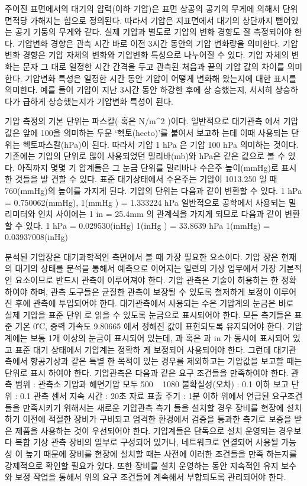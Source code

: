 \begin{itemize}
주어진 표면에서의 대기의 압력(이하 기압)은 표면 상공의 공기의 무게에
의해서 단위 면적당 가해지는 힘으로 정의된다. 따라서 기압은 지표면에서
대기의 상단까지 뻗어있는 공기 기둥의 무게와 같다. 실제 기압과 별도로
기압의 변화 경향도 잘 측정되어야 한다. 기압변화 경향은 관측 시간 바로
이전 3시간 동안의 기압 변화량을 의미한다. 기압변화 경향은 기압 자체의
변화와 기압변화 특성으로 나누어질 수 있다. 기압 자체의 변화는 문자 그
대로 일정한 시간 간격을 두고 관측된 처음과 끝의 기압 값의 차이를 의미
한다. 기압변화 특성은 일정한 시간 동안 기압이 어떻게 변화해 왔는지에
대한 표시를 의미한다. 예를 들어 기압이 지난 3시간 동안 하강한 후에 상
승했는지, 서서히 상승하다가 급하게 상승했는지가 기압변화 특성이 된다.


기압 측정의 기본 단위는 파스칼( 혹은 N/m^2 )이다. 일반적으로 대기관측
에서 기압값은 앞에 100을 의미하는 두문 ‘헥토(hecto)’를 붙여서 보고하
는데 이때 사용되는 단위는 헥토파스칼(hPa)이 된다. 따라서 기압 1 hPa 은 기압 100 hPa \을 의미하는 것이다. 기존에는 기압의 단위로 많이 사용되었던 밀리바(mb)와 hPa은 같은 값으로 볼 수 있다. 아직까지 몇몇 기 압계들은 그 눈금 단위를 밀리바나 수은주 높이(mmHg)로 표시한 것들을 발
견할 수 있다. 표준 대기상태에서 수은주는 기압이 1013.250 일 때
760(mmHg)의 높이를 가지게 된다.
기압의 단위는 다음과 같이 변환할 수 있다.
1 hPa = 0.750062(mmHg), 
1(mmHg ) = 1.333224 hPa
일반적으로 공학에서 사용되는 밀리미터와 인치 사이에는 1 in = 25.4mm
의 관계식을 가지게 되므로 다음과 같이 변환할 수 있다.
1 hPa = 0.029530(inHg)
1(inHg ) = 33.8639 hPa
1(mmHg) = 0.03937008(inHg)

분석된 기압장은 대기과학적인 측면에서 볼 때 가장 필요한 요소이다. 기압
장은 현재의 대기의 상태를 분석을 통해서 예측으로 이어지는 일련의 기상
업무에서 가장 기본적인 요소이므로 반드시 관측이 이루어져야 한다. 기압
관측은 기술이 허용하는 한 정확하여야 하며, 관측 도구들은 균질한 관측이
보장될 수 있도록 철저하게 보정이 이루어진 후에 관측에 투입되어야 한다.
대기관측에서 사용되는 수은 기압계의 눈금은 바로 실제 기압을 표준 단위
로 읽을 수 있도록 눈금으로 표시되어야 한다. 모든 측기들은 표준 기온
0℃, 중력 가속도 9.80665 에서 정해진 값이 표현되도록 유지되어야
한다.
기압계에는 보통 1개 이상의 눈금이 표시되어 있는데, 과 혹은
과 in 가 동시에 표시되어 있고 표준 대기 상태에서 기압계는 정확하
게 보정되어 사용되어야 한다. 그런데 대기관측에서 항공기상과 같은 특별
한 목적이 있는 경우를 제외하고는 기압값을 보고할 때는 단위로 표시
하여야 한다.
기압관측은 다음과 같은 요구 조건들을 만족하여야 한다.
관측 범위 : 관측소 기압과 해면기압 모두 500 ~ 1080
불확실성(오차) : 0.1 이하
보고 단위 : 0.1
관측 센서 지속 시간 : 20초
자료 표출 주기 : 1분 이하
위에서 언급된 요구조건들을 만족시키기 위해서는 새로운 기압관측 측기
들을 설치할 경우 장비를 현장에 설치하기 이전에 적절한 장비가 구비되고
엄격한 환경에서 검증을 통과한 측기로 보증을 받은 제품을 사용하는 것이
우선되어야 한다. 기압계들은 단독으로 설치 운영되는 경우보다 복합 기상
관측 장비의 일부로 구성되어 있거나, 네트워크로 연결되어 사용될 가능성
이 높기 때문에 장비를 현장에 설치할 때는 사전에 이러한 조건들을 만족
하는지를 강제적으로 확인할 필요가 있다. 또한 장비를 설치 운영하는 동안
지속적인 유지 보수와 보정 작업을 통해서 위의 요구 조건들에 계속해서
부합되도록 관리되어야 한다.


\end{itemize}
